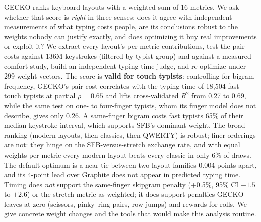 \documentclass{gecko-paper}
\begin{document}
\makepapertitle
\begin{paperabstract}
GECKO ranks keyboard layouts with a weighted sum of 16 metrics. We ask whether that score is \emph{right} in three senses: does it agree with independent measurements of what typing costs people, are its conclusions robust to the weights nobody can justify exactly, and does optimizing it buy real improvements or exploit it? We extract every layout's per-metric contributions, test the pair costs against 136M keystrokes (filtered by typist group) and against a measured comfort study, build an independent typing-time judge, and re-optimize under 299 weight vectors. The score is \textbf{valid for touch typists}: controlling for bigram frequency, GECKO's pair cost correlates with the typing time of 18{,}504 fast touch typists at partial $\rho=0.65$ and lifts cross-validated $R^2$ from 0.27 to 0.69, while the same test on one- to four-finger typists, whom its finger model does not describe, gives only 0.26. A same-finger bigram costs fast typists 65\% of their median keystroke interval, which supports SFB's dominant weight. The broad ranking (modern layouts, then classics, then QWERTY) is robust; finer orderings are not: they hinge on the SFB-versus-stretch exchange rate, and with equal weights per metric every modern layout beats every classic in only 6\% of draws. The default optimum is a near tie between two layout families 0.004 points apart, and its 4-point lead over Graphite does not appear in predicted typing time. Timing does \emph{not} support the same-finger skipgram penalty (+0.5\%, 95\% CI $-1.5$ to $+2.6$) or the stretch metric as weighted; it does support penalties GECKO leaves at zero (scissors, pinky–ring pairs, row jumps) and rewards for rolls. We give concrete weight changes and the tools that would make this analysis routine.
\end{paperabstract}
\end{document}
